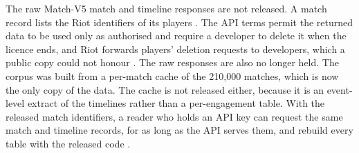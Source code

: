The raw Match-V5 match and timeline responses are not released. A match record lists the Riot
identifiers of its players \cite{riotapi2024matchv5}. The API terms permit the returned data to
be used only as authorised and require a developer to delete it when the licence ends, and Riot
forwards players' deletion requests to developers, which a public copy could not honour
\cite{riot2013apiterms}.
The raw responses are also no longer held. The corpus was built from a per-match cache of the
210,000 matches, which is now the only copy of the data. The cache is not released either, because
it is an event-level extract of the timelines rather than a per-engagement table.
With the released match identifiers, a reader who holds an API key can request the same match and
timeline records, for as long as the API serves them, and rebuild every table with the released
code \cite{riotapi2024matchv5,riotapi2024timeline}.
